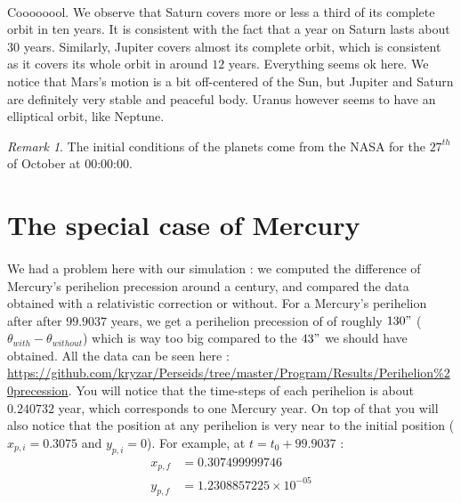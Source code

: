 \documentclass[a4paper, twoside, 11pt]{report}
\theoremstyle{theorem}
\theoremstyle{remark}
\newtheorem{remark}{Remark}[chapter]
\theoremstyle{exemple}
\begin{document}
        \paragraph{}Coooooool. We observe that Saturn covers more or less a third of its complete orbit in ten years. It is consistent with the fact that a year on Saturn lasts about 30 years. Similarly, Jupiter covers almost its complete orbit, which is consistent as it covers its whole orbit in around $12$ years. Everything seems ok here. We notice that Mars's motion is a bit off-centered of the Sun, but Jupiter and Saturn are definitely very stable and peaceful body. Uranus however seems to have an elliptical orbit, like Neptune.
        
        \begin{remark}
        	The initial conditions of the planets come from the NASA for the ${27}^{th}$ of October at 00:00:00.
		\end{remark} 
        
    
    \section{The special case of Mercury}
        
        \paragraph{}We had a problem here with our simulation : we computed the difference of Mercury's perihelion precession around a century, and compared the data obtained with a relativistic correction or without. For a Mercury's perihelion after after $99.9037$ years, we get a perihelion precession of of roughly $130"$ (${\theta}_{with}-{\theta}_{without}$) which is way too big compared to the $43"$ we should have obtained. All the data can be seen here : \url{https://github.com/kryzar/Perseids/tree/master/Program/Results/Perihelion\%20precession}. You will notice that the time-steps of each perihelion is about $0.240732$ year, which corresponds to one Mercury year. On top of that you will also notice that the position at any perihelion is very near to the initial position (${x}_{p,i} = 0.3075$ and ${y}_{p,i} = 0$). For example, at $t =  {t}_{0} + 99.9037$ : 
        	\begin{align*}
				{x}_{p,f} &= 0.307499999746 \\
				{y}_{p,f} &= 1.2308857225\times{10}^{-05}
			\end{align*}
		
\end{document}
